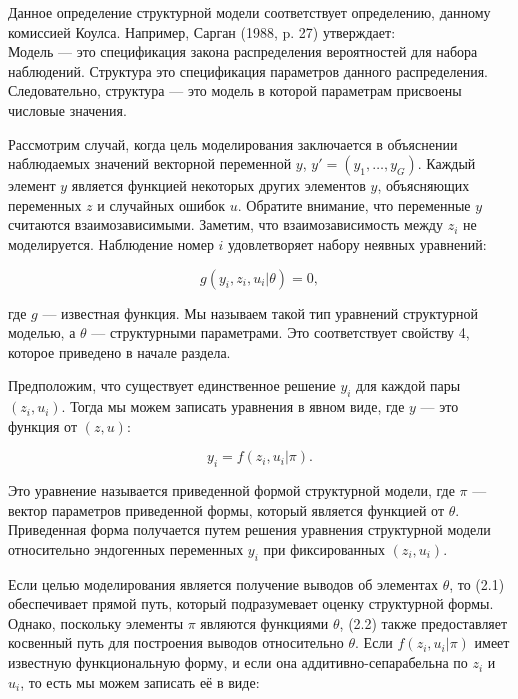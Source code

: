 Данное определение структурной модели соответствует определению, данному комиссией Коулса. Например, Сарган (1988, p. 27) утверждает: \\


Модель --- это спецификация закона распределения  вероятностей для набора наблюдений. Структура это спецификация параметров данного распределения. Следовательно, структура --- это модель в которой параметрам присвоены  числовые значения. 


Рассмотрим случай, когда цель моделирования заключается в объяснении наблюдаемых значений векторной переменной $y$, $y'= (y_{1}, \ldots , y_{G})$. Каждый элемент $y$ является функцией некоторых других элементов $y$, объясняющих переменных $z$ и случайных ошибок $u$. Обратите внимание, что переменные $y$ считаются взаимозависимыми. Заметим, что  взаимозависимость между $z_{i}$ не моделируется. Наблюдение номер  $i$ удовлетворяет набору неявных уравнений:
	
\begin{equation}
g(y_{i},z_{i},u_{i}|\theta)=0,
\end{equation}

где $g$ --- известная функция. Мы называем такой тип уравнений структурной моделью, а $\theta$  --- структурными параметрами. Это соответствует свойству 4, которое приведено в начале раздела. 


Предположим, что существует единственное решение $y_{i}$ для каждой пары $(z_{i},u_{i})$. Тогда мы можем записать уравнения в явном виде, где  $y$ --- это функция от $(z, u)$:

\begin{equation}
y_{i}=f(z_{i},u_{i}|\pi).
\end{equation}


Это уравнение называется приведенной формой структурной модели, где $\pi$ --- вектор параметров приведенной формы, который является функцией от $\theta$. Приведенная форма получается путем решения уравнения структурной модели относительно эндогенных переменных $y_{i}$ при фиксированных $(z_{i},u_{i})$. 


Если целью моделирования является получение выводов об элементах $\theta$, то (2.1) обеспечивает прямой путь, который подразумевает оценку структурной формы. Однако, поскольку элементы $\pi$ являются функциями $\theta$, (2.2) также предоставляет косвенный путь для построения выводов относительно $\theta$. Если $f(z_{i},u_{i}|\pi)$ имеет известную функциональную форму, и если она аддитивно-сепарабельна по $z_{i}$ и $u_{i}$, то есть мы можем записать её в виде:
	
